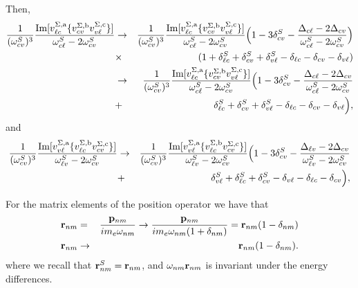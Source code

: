 \documentclass[floatfix,prb,aps,superscriptaddress,11pt]{revtex4}
\begin{document}
Then,
\begin{eqnarray}\label{t02}
\frac{1}{(\omega_{cv}^{S})^{3}}
\frac{\mbox{Im}\lbrack 
v_{\ell c}^{\Sigma ,\mathrm{a}}\{v_{cv}^{\Sigma ,\mathrm{b}}v_{v\ell }^{\Sigma ,\mathrm{c}}\}]}
{\omega_{c\ell }^{S}-2\omega_{cv}^{S}}
&\to&
\frac{1}{(\omega_{cv}^{S})^3}
\frac{\mbox{Im}\lbrack 
v_{\ell c}^{\Sigma ,\mathrm{a}}\{v_{cv}^{\Sigma ,\mathrm{b}}v_{v\ell }^{\Sigma ,\mathrm{c}}\}]}
{\omega_{c\ell }^{S}-2\omega_{cv}^S}
\Big(1-3\delta^S_{cv}
-\frac{\Delta_{c\ell}-2\Delta_{cv}}{\omega_{c\ell }^{S}-2\omega_{cv}^S}\Big)
\nonumber\\
&\times&
(1+\delta^S_{\ell c}+\delta^S_{cv}+\delta^S_{v\ell}
-\delta_{\ell c}-\delta_{cv}-\delta_{v\ell})
\nonumber\\
&\to&
\frac{1}{(\omega_{cv}^{S})^3}
\frac{\mbox{Im}\lbrack 
v_{\ell c}^{\Sigma ,\mathrm{a}}\{v_{cv}^{\Sigma ,\mathrm{b}}v_{v\ell }^{\Sigma ,\mathrm{c}}\}]}
{\omega_{c\ell }^{S}-2\omega_{cv}^S}
\Big(1-3\delta^S_{cv}
-\frac{\Delta_{c\ell}-2\Delta_{cv}}{\omega_{c\ell }^{S}-2\omega_{cv}^S}
\nonumber\\
&+&
\delta^S_{\ell c}+\delta^S_{cv}+\delta^S_{v\ell}
-\delta_{\ell c}-\delta_{cv}-\delta_{v\ell}\Big)
,
\end{eqnarray} 
and
\begin{eqnarray}\label{t02}
\frac{1}{(\omega_{cv}^{S})^{3}}
\frac{\mbox{Im}\lbrack
v_{v\ell}^{\Sigma ,\mathrm{a}}\{v_{\ell c}^{\Sigma ,\mathrm{b}}v_{cv}^{\Sigma ,\mathrm{c}}\}]}
{\omega_{\ell v }^{S}-2\omega_{cv}^{S}}
&\to&
\frac{1}{(\omega_{cv}^{S})^3}
\frac{\mbox{Im}\lbrack
v_{v\ell}^{\Sigma ,\mathrm{a}}\{v_{\ell c}^{\Sigma ,\mathrm{b}}v_{cv}^{\Sigma ,\mathrm{c}}\}]}
{\omega_{\ell v }^{S}-2\omega_{cv}^S}
\Big(1-3\delta^S_{cv}
-\frac{\Delta_{\ell v}-2\Delta_{cv}}{\omega_{\ell v}^{S}-2\omega_{cv}^S}
\nonumber\\
&+&
\delta^S_{v\ell}+\delta^S_{\ell c}+\delta^S_{cv}
-\delta_{v\ell}-\delta_{\ell c}-\delta_{cv}\Big)
,
\end{eqnarray}

For the matrix elements of the position operator we have that
\begin{eqnarray}\label{rnmenm}
\mathbf{r}_{nm}
&=&
\frac{\mathbf{p}_{nm}}{im_e\omega_{nm}}
\to
\frac{\mathbf{p}_{nm}}{im_e\omega_{nm}(1+\delta_{nm})}
=
\mathbf{r}_{nm}(1-\delta_{nm})
\nonumber \\
\mathbf{r}_{nm}
&\to&
\mathbf{r}_{nm}(1-\delta_{nm})
.
\end{eqnarray} 
where we recall that $\mathbf{r}_{nm}^S=\mathbf{r}_{nm}$, and $\omega_{nm}\mathbf{r}_{nm}$
is invariant under the energy differences.
\end{document}
